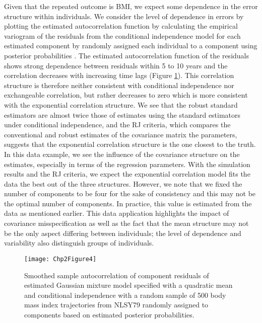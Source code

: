 Given that the repeated outcome is BMI, we expect some dependence in the error structure within individuals.  We consider the level of dependence in errors by plotting the estimated autocorrelation function by calculating the empirical variogram of the residuals from the conditional independence model \cite{diggle2002} for each estimated component by randomly assigned each individual to a component using posterior probabilities \cite{wang2005}. The estimated autocorrelation function of the residuals shows strong dependence between residuals within 5 to 10 years and the correlation decreases with increasing time lags (Figure \ref{fig:2-4}). This correlation structure is therefore neither consistent with conditional independence nor exchangeable correlation, but rather decreases to zero which is more consistent with the exponential correlation structure. We see that the robust standard estimators are almost twice those of estimates using the standard estimators under conditional independence, and the RJ criteria, which compares the conventional and robust estimates of the covariance matrix the parameters, suggests that the exponential correlation structure is the one closest to the truth. \\

 In this data example, we see the influence of the covariance structure on the estimates, especially in terms of the regression parameters. With the simulation results and the RJ criteria, we expect the exponential correlation model fits the data the best out of the three structures. However, we note that we fixed the number of components to be four for the sake of consistency and this may not be the optimal number of components. In practice, this value is estimated from the data as mentioned earlier. This data application highlights the impact of covariance misspecification as well as the fact that the mean structure may not be the only aspect differing between individuals; the level of dependence and variability also distinguish groups of individuals. 
\begin{figure}
\begin{center}
\texttt{[image: Chp2Figure4]}
\end{center}
\caption{Smoothed sample autocorrelation of component residuals of estimated Gaussian mixture model specified with a quadratic mean and conditional independence with a random sample of 500 body mass index trajectories from NLSY79 randomly assigned to components based on estimated posterior probabilities. }
\label{fig:2-4}
\end{figure}

